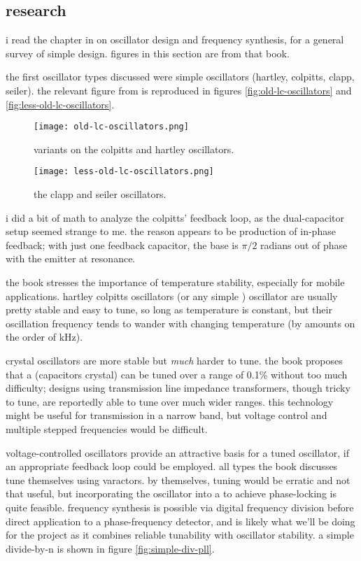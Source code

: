 \subsection*{research}
i read the chapter in \autocite{experimental-rf} on oscillator design and
frequency synthesis, for a general survey of simple \vco design. figures in
this section are from that book.

the first oscillator types discussed were simple \lc oscillators (hartley,
colpitts, clapp, seiler). the relevant figure from \autocite{experimental-rf}
is reproduced in figures \ref{fig:old-lc-oscillators} and
\ref{fig:less-old-lc-oscillators}.

\begin{figure}[H]
	\centering
	\texttt{[image: old-lc-oscillators.png]}
	\caption{variants on the colpitts and hartley oscillators.}
	\label{fig:lc-oscillators}
\end{figure}

\begin{figure}[H]
	\centering
	\texttt{[image: less-old-lc-oscillators.png]}
	\caption{the clapp and seiler oscillators.}
	\label{fig:lc-oscillators}
\end{figure}

i did a bit of math to analyze the colpitts' feedback loop, as the
dual-capacitor setup seemed strange to me. the reason appears to be production
of in-phase feedback; with just one feedback capacitor, the base is \(\pi/2\)
radians out of phase with the emitter at resonance.

the book stresses the importance of temperature stability, especially for
mobile applications. hartley \amp colpitts oscillators (or any simple \lc)
oscillator are usually pretty stable and easy to tune, so long as temperature
is constant, but their oscillation frequency tends to wander with changing
temperature (by amounts on the order of kHz).

crystal oscillators are more stable but \emph{much} harder to tune. the book
proposes that a \vxo (capacitors \amp crystal) can be tuned over a range of
0.1\% without too much difficulty; designs using transmission line impedance
transformers, though tricky to tune, are reportedly able to tune over much
wider ranges. this technology might be useful for \fm transmission in a narrow
band, but voltage control and multiple stepped frequencies would be difficult.

voltage-controlled \lc oscillators provide an attractive basis for a tuned
oscillator, if an appropriate feedback loop could be employed. all types the
book discusses tune themselves using varactors. by themselves, tuning would be
erratic and not that useful, but incorporating the oscillator into a \pll to
achieve phase-locking is quite feasible. frequency synthesis is possible via
digital frequency division before direct application to a phase-frequency
detector, and is likely what we'll be doing for the project as it combines
reliable tunability with oscillator stability. a simple divide-by-n \pll is
shown in figure \ref{fig:simple-div-pll}.

